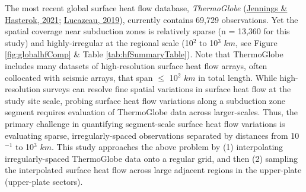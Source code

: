 The most recent global surface heat flow database, \emph{ThermoGlobe} (\protect\hyperlink{ref-jennings2021}{Jennings \& Hasterok, 2021}; \protect\hyperlink{ref-lucazeau2019}{Lucazeau, 2019}), currently contains 69,729 observations. Yet the spatial coverage near subduction zones is relatively sparse (n = 13,360 for this study) and highly-irregular at the regional scale (10\(^2\) to 10\(^3\) \(km\), see Figure \ref{fig:globalhfComp} \& Table \ref{tab:hfSummaryTable}). Note that ThermoGlobe includes many datasets of high-resolution surface heat flow arrays, often collocated with seismic arrays, that span \(\leq\) 10\(^2\) \(km\) in total length. While high-resolution surveys can resolve fine spatial variations in surface heat flow at the study site scale, probing surface heat flow variations along a subduction zone segment requires evaluation of ThermoGlobe data across larger-scales. Thus, the primary challenge in quantifying segment-scale surface heat flow variations is evaluating sparse, irregularly-spaced observations separated by distances from 10\(^{-1}\) to 10\(^3\) \(km\). This study approaches the above problem by (1) interpolating irregularly-spaced ThermoGlobe data onto a regular grid, and then (2) sampling the interpolated surface heat flow across large adjacent regions in the upper-plate (upper-plate sectors).



